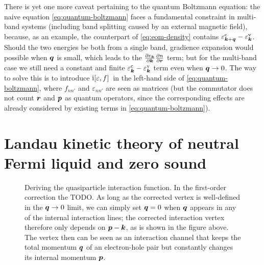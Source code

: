 \documentclass[hyperref, a4paper]{article}
\newcommand*{\ii}{\mathrm{i}}
\begin{document}
There is yet one more caveat pertaining to the quantum Boltzmann equation:
the naive equation \eqref{eq:quantum-boltzmann} faces a fundamental constraint in multi-band systems
(including band splitting caused by an external magnetic field),
because, as an example, the counterpart of \eqref{eq:eom-density}
contains $\varepsilon^{\text{c}}_{\vb*{k} + \vb*{q}} - \varepsilon^{\text{v}}_{\vb*{k}}$.
Should the two energies be both from a single band, 
gradience expansion would possible when $\vb*{q}$ is small, 
which leads to the $\pdv{\varepsilon_{\vb*{k}}}{\vb*{k}} \pdv{n}{\vb*{r}}$ term;
but for the multi-band case we still need a constant and finite 
$\varepsilon^{\text{c}}_{\vb*{k}} - \varepsilon^{\text{v}}_{\vb*{k}}$ term
even when $\vb*{q} \to 0$.
The way to solve this is to introduce $\ii \comm*{\varepsilon}{f}$ 
in the left-hand side of \eqref{eq:quantum-boltzmann},
where $f_{n n'}$ and $\varepsilon_{n n'}$
are seen as matrices (but the commutator does not count $\vb*{r}$ and $\vb*{p}$ as 
quantum operators, since the corresponding effects are already considered 
by existing terms in \eqref{eq:quantum-boltzmann}).

\section{Landau kinetic theory of neutral Fermi liquid and zero sound} 

\begin{figure}
    \centering
    
    \caption{Deriving the quasiparticle interaction function.
    In the first-order correction the TODO.
    As long as the corrected vertex is well-defined in the $\vb*{q} \to 0$ limit, 
    we can simply set $\vb*{q} = 0$ when $\vb*{q}$ appears 
    in any of the internal interaction lines;
    the corrected interaction vertex therefore only depends on $\vb*{p} - \vb*{k}$,
    as is shown in the figure above.
    The vertex then can be seen as an interaction channel 
    that keeps the total momentum $\vb*{q}$ of an electron-hole pair 
    but constantly changes its internal momentum $\vb*{p}$.}
\end{figure}
\end{document}
